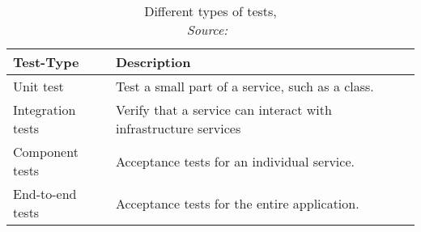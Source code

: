 \documentclass[12pt, a4paper]{article}
\begin{document}
        \begin{table}[]
            \centering
            \begin{tabularx}{0.9\textwidth}{lX}
                Test-Type & Description \\ \midrule\midrule
                Unit test& Test a small part of a service, such as a class.\\
                Integration tests & Verify that a service can interact with infrastructure services \\
                Component tests & Acceptance tests for an individual service. \\
                End-to-end tests & Acceptance tests for the entire application.
            \end{tabularx}
            \caption{Different types of tests, \\\textit{Source:~\cite{microtest}}}\label{tab::tests}
        \end{table}
\end{document}
